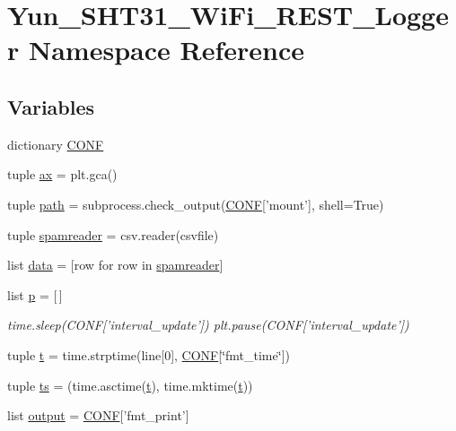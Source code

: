 \hypertarget{namespaceYun__SHT31__WiFi__REST__Logger}{\section{Yun\-\_\-\-S\-H\-T31\-\_\-\-Wi\-Fi\-\_\-\-R\-E\-S\-T\-\_\-\-Logger Namespace Reference}
\label{namespaceYun__SHT31__WiFi__REST__Logger}
}
\subsection*{Variables}
\begin{DoxyCompactItemize}
\item 
dictionary \hyperlink{namespaceYun__SHT31__WiFi__REST__Logger_a5091bede7a4a75e0a5c6446ceaa65f5e}{C\-O\-N\-F}
\item 
tuple \hyperlink{namespaceYun__SHT31__WiFi__REST__Logger_a80a836a108184fb61377ed6a60dbbe06}{ax} = plt.\-gca()
\item 
tuple \hyperlink{namespaceYun__SHT31__WiFi__REST__Logger_a8f92e4f4418b5be2b5415431929989be}{path} = subprocess.\-check\-\_\-output(\hyperlink{namespaceYun__SHT31__WiFi__REST__Logger_a5091bede7a4a75e0a5c6446ceaa65f5e}{C\-O\-N\-F}\mbox{[}'mount'\mbox{]}, shell=True)
\item 
tuple \hyperlink{namespaceYun__SHT31__WiFi__REST__Logger_a9c232b263a08fcf2b76be10967951c4b}{spamreader} = csv.\-reader(csvfile)
\item 
list \hyperlink{namespaceYun__SHT31__WiFi__REST__Logger_a0aae5764084004c5362d48b5fe3cc991}{data} = \mbox{[}row for row in \hyperlink{namespaceYun__SHT31__WiFi__REST__Logger_a9c232b263a08fcf2b76be10967951c4b}{spamreader}\mbox{]}
\item 
list \hyperlink{namespaceYun__SHT31__WiFi__REST__Logger_a4ef8fe44943a727c006ec1a4aa9ca85d}{p} = \mbox{[}$\,$\mbox{]}
\begin{DoxyCompactList}\small\item\em time.\-sleep(C\-O\-N\-F\mbox{[}'interval\-\_\-update'\mbox{]}) plt.\-pause(C\-O\-N\-F\mbox{[}'interval\-\_\-update'\mbox{]}) \end{DoxyCompactList}\item 
tuple \hyperlink{namespaceYun__SHT31__WiFi__REST__Logger_a8bf98582a5c24eb1e5be5a521b717256}{t} = time.\-strptime(line\mbox{[}0\mbox{]}, \hyperlink{namespaceYun__SHT31__WiFi__REST__Logger_a5091bede7a4a75e0a5c6446ceaa65f5e}{C\-O\-N\-F}\mbox{[}\char`\"{}fmt\-\_\-time\char`\"{}\mbox{]})
\item 
tuple \hyperlink{namespaceYun__SHT31__WiFi__REST__Logger_afcdae84a5401eb4cc3a8b3a31fd07537}{ts} = (time.\-asctime(\hyperlink{namespaceYun__SHT31__WiFi__REST__Logger_a8bf98582a5c24eb1e5be5a521b717256}{t}), time.\-mktime(\hyperlink{namespaceYun__SHT31__WiFi__REST__Logger_a8bf98582a5c24eb1e5be5a521b717256}{t}))
\item 
list \hyperlink{namespaceYun__SHT31__WiFi__REST__Logger_ad449e0bc29b40e813c66bfd22caee772}{output} = \hyperlink{namespaceYun__SHT31__WiFi__REST__Logger_a5091bede7a4a75e0a5c6446ceaa65f5e}{C\-O\-N\-F}\mbox{[}'fmt\-\_\-print'\mbox{]}
\end{DoxyCompactItemize}


